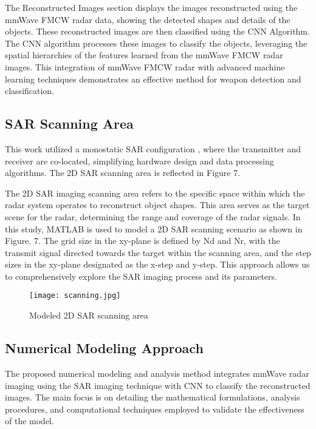 \documentclass[journal,article,submit,pdftex,moreauthors]{Definitions/mdpi}
\begin{document}
The Reconstructed Images section displays the images reconstructed using the mmWave FMCW radar data, showing the detected shapes and details of the objects. These reconstructed images are then classified using the CNN Algorithm. The CNN algorithm processes these images to classify the objects, leveraging the spatial hierarchies of the features learned from the mmWave FMCW radar images. This integration of mmWave FMCW radar with advanced machine learning techniques demonstrates an effective method for weapon detection and classification.

\subsection{SAR Scanning Area}
This work utilized a monostatic SAR configuration \cite{chandrawadde2024modeling,chandrawadde2024ml}, where the transmitter and receiver are co-located, simplifying hardware design and data processing algorithms. The 2D SAR scanning area is reflected in Figure 7.



The 2D SAR imaging scanning area refers to the specific space within which the radar system operates to reconstruct object shapes. This area serves as the target scene for the radar, determining the range and coverage of the radar signals. In this study, MATLAB is used to model a 2D SAR scanning scenario as shown in Figure. 7. The grid size in the xy-plane is defined by Nd and Nr, with the transmit signal directed towards the target within the scanning area, and the step sizes in the xy-plane designated as the x-step and y-step. This approach allows us to comprehensively explore the SAR imaging process and its parameters.

\begin{figure}[h]
  \centering
  \texttt{[image: scanning.jpg]}
  \caption{Modeled 2D SAR scanning area}
  \label{Figure:}
\end{figure}
\subsection{Numerical Modeling Approach}
The proposed numerical modeling and analysis method integrates mmWave radar imaging using the SAR imaging technique with CNN to classify the reconstructed images. The main focus is on detailing the mathematical formulations, analysis procedures, and computational techniques employed to validate the effectiveness of the model.
\end{document}
